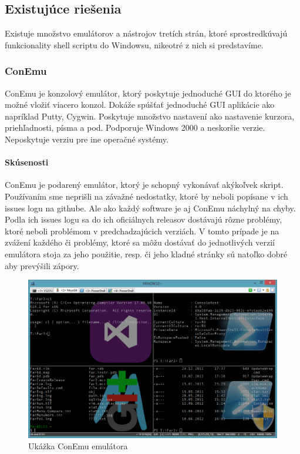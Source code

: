 \subsection{Existujúce riešenia}
\indent
Existuje množstvo emulátorov a nástrojov tretích strán, ktoré sprostredkúvajú funkcionality shell scriptu do Windowsu, nikeotré z nich si predstavíme.

\subsubsection{ConEmu}
\indent ConEmu je konzolový emulátor, ktorý poskytuje jednoduché GUI do ktorého je možné vložiť viacero konzol. Dokáže spúšťať jednoduché GUI aplikácie ako napríklad Putty, Cygwin. Poskytuje množstvo nastavení ako nastavenie kurzora, priehľadnosti, písma a pod. Podporuje Windows 2000 a neskoršie verzie. Neposkytuje verziu pre ine operačné systémy. 
\paragraph{Skúsenosti}
\indent ConEmu je podarený emulátor, ktorý je schopný vykonávať akýkoľvek skript. Používaním sme neprišli na závažné nedostatky, ktoré by neboli popísane v ich issues logu na githube. Ale ako každý software je aj ConEmu náchylný na chyby. Podla ich issues logu sa do ich oficiálnych releasov dostávajú rôzne problémy, ktoré neboli problémom v predchadzajúcich verziách. V tomto prípade je na zvážení každého či problémy, ktoré sa môžu dostávať do jednotlivých verzií emulátora stoja za jeho použitie, resp. či jeho kladné stránky sú natoľko dobré aby prevýšili zápory.

\begin{figure}[!htbp]
\centering
\includegraphics[scale=0.3]{img/conEmuImg.jpg}
\caption{Ukážka ConEmu emulátora}
\label{fig:test}
\end{figure}
\newpage
